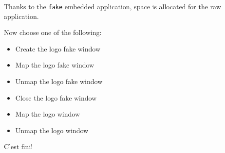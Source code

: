\documentclass[12pt]{article}
\begin{document}

Thanks to the {\tt fake} embedded application, space is allocated for
the raw application.






Now choose one of the following:

\begin{itemize}
\item {}
  {Create the {\ActiveDVI} logo fake window}
\item {}
  {Map the {\ActiveDVI} logo fake window}
\item {}
  {Unmap the {\ActiveDVI} logo fake window}
\item {}
  {Close the {\ActiveDVI} logo fake window}
\item {}
  {Map the {\ActiveDVI} logo window}
\item {}
  {Unmap the {\ActiveDVI} logo window}
\end{itemize}

C'est fini!
\end{document}

